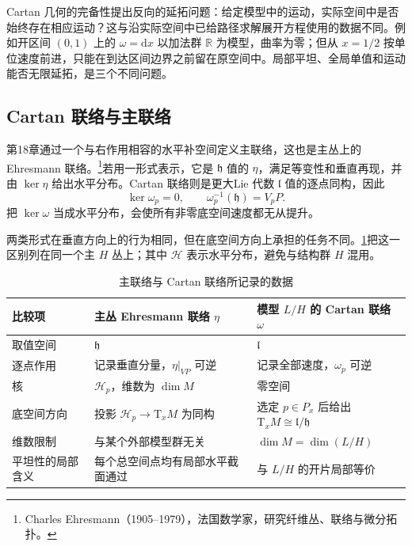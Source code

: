 \ProseParagraphBreak

Cartan 几何的完备性提出反向的延拓问题：给定模型中的运动，实际空间中是否始终存在相应运动？这与沿实际空间中已给路径求解展开方程使用的数据不同。例如开区间 \((0,1)\) 上的 \(\omega=\mathrm{d}x\) 以加法群 \(\mathbb R\) 为模型，曲率为零；但从 \(x=1/2\) 按单位速度前进，只能在到达区间边界之前留在原空间中。局部平坦、全局单值和运动能否无限延拓，是三个不同问题。

\subsection{Cartan 联络与主联络}
\label{g1:subsec:D02:03}

第18章通过一个与右作用相容的水平补空间定义主联络，这也是主丛上的 Ehresmann 联络。\footnote{Charles Ehresmann（1905--1979），法国数学家，研究纤维丛、联络与微分拓扑。}若用一形式表示，它是 \(\mathfrak h\) 值的 \(\eta\)，满足等变性和垂直再现，并由 \(\ker\eta\) 给出水平分布。Cartan 联络则是更大Lie 代数 \(\mathfrak l\) 值的逐点同构，因此
\[
	\ker\omega_p=0,\qquad
	\omega_p^{-1}(\mathfrak h)=V_pP.
\]
把 \(\ker\omega\) 当成水平分布，会使所有非零底空间速度都无从提升。

\ProseParagraphBreak

两类形式在垂直方向上的行为相同，但在底空间方向上承担的任务不同。\cref{g1:tab:cartan-ehresmann}把这一区别列在同一个主 \(H\) 丛上；其中 \(\mathcal H\) 表示水平分布，避免与结构群 \(H\) 混用。
\begin{table}[htbp]
	\centering
	\caption{主联络与 Cartan 联络所记录的数据}
	\label{g1:tab:cartan-ehresmann}
	\begin{tabularx}{\linewidth}{@{}lXX@{}}
		\toprule
		比较项 & 主丛 Ehresmann 联络 \(\eta\) & 模型 \(L/H\) 的 Cartan 联络 \(\omega\)\\
		\midrule
		取值空间 & \(\mathfrak h\) & \(\mathfrak l\)\\
		逐点作用 & 记录垂直分量，\(\eta|_{VP}\) 可逆 & 记录全部速度，\(\omega_p\) 可逆\\
		核 & \(\mathcal H_p\)，维数为 \(\dim M\) & 零空间\\
		底空间方向 & 投影 \(\mathcal H_p\to\mathrm{T}_xM\) 为同构 & 选定 \(p\in P_x\) 后给出 \(\mathrm{T}_xM\cong\mathfrak l/\mathfrak h\)\\
		维数限制 & 与某个外部模型群无关 & \(\dim M=\dim(L/H)\)\\
		平坦性的局部含义 & 每个总空间点均有局部水平截面通过 & 与 \(L/H\) 的开片局部等价\\
		\bottomrule
	\end{tabularx}
\end{table}

